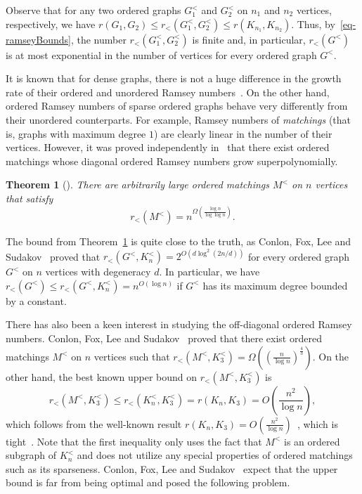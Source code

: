 \documentclass[11pt,a4paper]{article}
\newtheorem{thm}{Theorem}%
\theoremstyle{remark}
\begin{document}
Observe that for any two ordered graphs $G^<_1$ and $G^<_2$ on $n_1$ and $n_2$ vertices, respectively, we have
$r(G_1, G_2) \leq r_<(G^<_1, G^<_2) \leq r(K_{n_1},K_{n_2})$.
Thus, by~\eqref{eq-ramseyBounds}, the number $r_<(G^<_1, G^<_2)$ is finite and, in particular, $r_<(G^<)$ is at most exponential in the number of vertices for every ordered graph $G^<$.

It is known that for dense graphs, there is not a huge difference in the growth rate of their ordered and unordered Ramsey numbers~\cite{balko,conlon}.
On the other hand, ordered Ramsey numbers of sparse ordered graphs behave very differently from their unordered counterparts.
For example,  Ramsey numbers of \emph{matchings} (that is, graphs with maximum degree $1$) are clearly linear in the number of their vertices. However, it was proved independently in~\cite{balko, conlon} that there exist ordered matchings whose diagonal ordered Ramsey numbers grow superpolynomially. 

\begin{thm}[\cite{balko,conlon}]
\label{superpolynomial_matchings}
There are arbitrarily large ordered matchings $M^<$ on $n$ vertices that satisfy
\[r_<(M^<) = n^{\Omega\left(\frac{\log n}{\log{\log n}}\right)}.\]
\end{thm}


The bound from Theorem~\ref{superpolynomial_matchings} is quite close to the truth, as Conlon, Fox, Lee and Sudakov~\cite{conlon} proved that $r_<(G^<,K^<_n) = 2^{O(d\log^2{(2n/d)})}$ for every ordered graph $G^<$ on $n$ vertices with degeneracy $d$.
In particular, we have $r_<(G^<) \leq r_<(G^<,K^<_n) = n^{O(\log{n})}$ if $G^<$ has its maximum degree bounded by a constant.


There has also been a keen interest in studying the off-diagonal ordered Ramsey numbers.
Conlon, Fox, Lee and Sudakov~\cite{conlon} proved that there exist ordered matchings $M^<$ on $n$ vertices such that $r_<(M^<,K^<_3) = \Omega\left(\left(\frac{n}{\log n}\right) ^{\frac{4}{3}}\right)$. On the other hand, the best known upper bound on $r_<(M^<,K^<_3)$ is
\[r_<(M^<,K^<_3) \leq r_<(K^<_n,K^<_3)=r(K_n,K_3) = O\left(  \frac{n^2}{\log n} \right),\]
which follows from the well-known result $r(K_n,K_3) = O\left(\frac{n^2}{\log n} \right)$~\cite{odhadtrojuhelnik}, which is tight~\cite{odhadtrojuhelnik2}. 
Note that the first inequality only uses the fact that $M^<$ is an ordered subgraph of $K^<_n$ and does not utilize any special properties of ordered matchings such as its sparseness.
Conlon, Fox, Lee and Sudakov~\cite{conlon} expect that
the upper bound is far from being optimal and posed the following problem.
\end{document}
